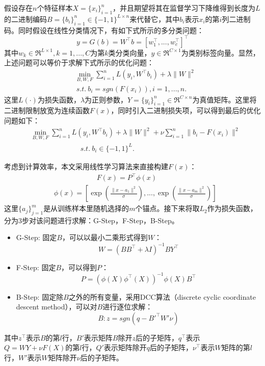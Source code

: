 假设存在$n$个特征样本$X=\{x_i\}^{n}_{i=1}$，并且期望将其在监督学习下降维得到长度为$L$的二进制编码$B=\{b_i\}^{n}_{i=1}\in\{-1,1\}^{L\times n}$来代替它，其中$b_i$表示$x_i$的第$i$列二进制码。同时假设在线性分类情况下，有如下式所示的多分类问题：
\begin{equation}
	y=G(b)=W^{\top}b=\left[w_1^\top,...,w_c^\top\right]^\top
\end{equation}
其中$w_k\in \Re^{L\times 1},k=1,...,C$为第$k$类分类向量，$y\in \Re^{C\times 1}$为类别标签向量。显然，上述问题可以等价于求解下式所示的优化问题：
\begin{equation}
\begin{aligned}
	& \min_{B,W,F} \sum_{i=1}^n L\left(y_i,W^\top b_i\right)+\lambda \|W\|^2 \\
	& \ s.t. \  b_i=sgn\left(F(x_i)\right),i=1,...,n.
\end{aligned}
\end{equation}
这里$L(\cdot)$为损失函数，$\lambda$为正则参数，$Y=\{y_i\}_{i=1}^n\in\Re ^{C\times n}$为真值矩阵。这里将二进制限制放宽为连续函数$F(x)$，同时引入二进制损失项，可以得到最后的优化问题如下：
\begin{equation}
\begin{aligned}
	& \min_{B,W,F} \sum_{i=1}^n L\left(y_i,W^\top b_i\right)+\lambda \|W\|^2 + \nu\sum_{i=1}^n \|b_i-F(x_i)\|^2     \\
	& \quad\quad\quad\quad\quad\quad\quad s.t. \  b_i\in\{-1,1\}^L.
\end{aligned}
\end{equation}

考虑到计算效率，本文采用线性学习算法来直接构建$F(x)$：
\begin{equation}
\begin{aligned}
	& \quad\quad\quad\quad\quad\quad F(x)=P^\top\phi(x) \\
	& \phi(x)=\left[\exp(\frac{\|x-a_1\|^2}{\sigma}),...,\exp(\frac{\|x-a_m\|^2}{\sigma})\right]
\end{aligned}
\end{equation}
这里$\{a_j\}_{j=1}^m$是从训练样本里随机选择的$m$个锚点。接下来将取$L_2$作为损失函数，分为3步对该问题进行求解：G-Step，F-Step，B-Step。
\begin{itemize}
\item G-Step: 固定$B$，可以以最小二乘形式得到$W$：
\begin{equation}
	W=(BB^\top+\lambda I)^{-1}BY^\top
\end{equation}
\item F-Step: 固定$B$，可以得到$P$：
\begin{equation}
	P=\left(\phi(X)\phi^\top(X)\right)^{-1}\phi(X)B^\top
\end{equation}
\item B-Step: 固定除$B$之外的所有变量，采用DCC算法（discrete cyclic coordinate descent method），可以对$B$进行逐位求解：
\begin{equation}
	B: z=sgn(q-B'^\top W'\nu)
\end{equation}
\end{itemize}
其中$z^\top$表示$B$的第$l$行，$B'$表示矩阵$B$除开$z$后的子矩阵，$q^\top$表示$Q=WY+\nu F(X)$的第$l$行，$Q'$表示矩阵除开$q$后的子矩阵，$\nu^\top$表示$W$矩阵的第$l$行，$W'$表示$W$矩阵除开$\nu$后的子矩阵。

